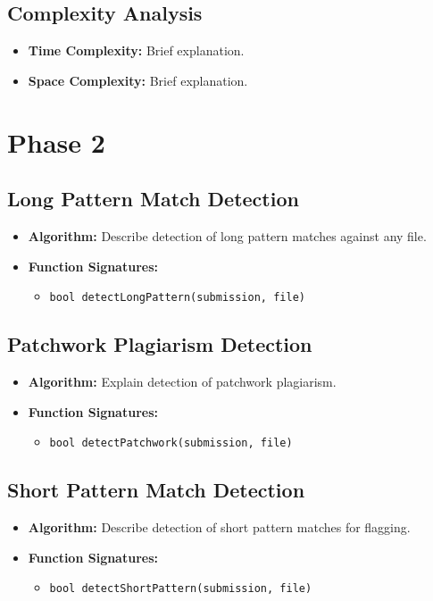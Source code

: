 \documentclass[12pt]{article}
\begin{document}
\subsection{Complexity Analysis}
\begin{itemize}[noitemsep]
    \item \textbf{Time Complexity:} Brief explanation.
    \item \textbf{Space Complexity:} Brief explanation.
\end{itemize}

\section{Phase 2}

\subsection{Long Pattern Match Detection}
\begin{itemize}[noitemsep]
    \item \textbf{Algorithm:} Describe detection of long pattern matches against any file.
    \item \textbf{Function Signatures:}
    \begin{itemize}
        \item \texttt{bool detectLongPattern(submission, file)}
    \end{itemize}
\end{itemize}

\subsection{Patchwork Plagiarism Detection}
\begin{itemize}[noitemsep]
    \item \textbf{Algorithm:} Explain detection of patchwork plagiarism.
    \item \textbf{Function Signatures:}
    \begin{itemize}
        \item \texttt{bool detectPatchwork(submission, file)}
    \end{itemize}
\end{itemize}

\subsection{Short Pattern Match Detection}
\begin{itemize}[noitemsep]
    \item \textbf{Algorithm:} Describe detection of short pattern matches for flagging.
    \item \textbf{Function Signatures:}
    \begin{itemize}
        \item \texttt{bool detectShortPattern(submission, file)}
    \end{itemize}
\end{itemize}
\end{document}
